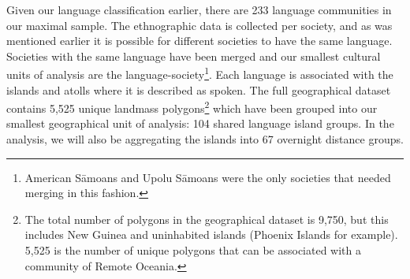\documentclass[unnumsec,webpdf,modern,medium]{oup-authoring-template}
\begin{document}



Given our language classification earlier, there are 233 language communities in our maximal sample. The ethnographic data is collected per society, and as was mentioned earlier it is possible for different societies to have the same language. Societies with the same language have been merged and our smallest cultural units of analysis are the language-society\footnote{American S\={a}moans and Upolu S\={a}moans were the only societies that needed merging in this fashion.}. Each language is associated with the islands and atolls where it is described as spoken. The full geographical dataset contains 5,525 unique landmass polygons\footnote{The total number of polygons in the geographical dataset is 9,750, but this includes New Guinea and uninhabited islands (Phoenix Islands for example). 5,525 is the number of unique polygons that can be associated with a community of Remote Oceania.} which have been grouped into our smallest geographical unit of analysis: 104 shared language island groups. In the analysis, we will also be aggregating the islands into 67 overnight distance groups.
\end{document}
